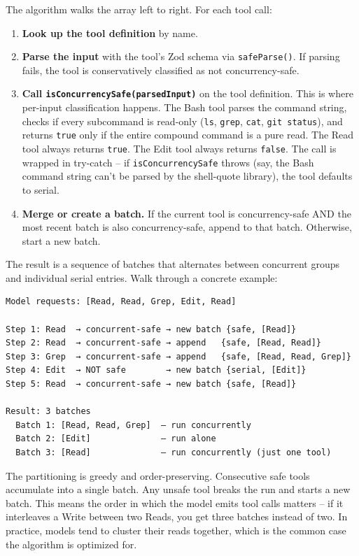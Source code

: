 \documentclass[
  english,
  11pt,
  letterpaper,
]{book}
\providecommand{\tightlist}{%
  \setlength{\itemsep}{0pt}\setlength{\parskip}{0pt}}
\begin{document}
The algorithm walks the array left to right. For each tool call:

\begin{enumerate}
\def\labelenumi{\arabic{enumi}.}
\tightlist
\item
  \textbf{Look up the tool definition} by name.
\item
  \textbf{Parse the input} with the tool's Zod schema via
  \texttt{safeParse()}. If parsing fails, the tool is conservatively
  classified as not concurrency-safe.
\item
  \textbf{Call \texttt{isConcurrencySafe(parsedInput)}} on the tool
  definition. This is where per-input classification happens. The Bash
  tool parses the command string, checks if every subcommand is
  read-only (\texttt{ls}, \texttt{grep}, \texttt{cat},
  \texttt{git\ status}), and returns \texttt{true} only if the entire
  compound command is a pure read. The Read tool always returns
  \texttt{true}. The Edit tool always returns \texttt{false}. The call
  is wrapped in try-catch -- if \texttt{isConcurrencySafe} throws (say,
  the Bash command string can't be parsed by the shell-quote library),
  the tool defaults to serial.
\item
  \textbf{Merge or create a batch.} If the current tool is
  concurrency-safe AND the most recent batch is also concurrency-safe,
  append to that batch. Otherwise, start a new batch.
\end{enumerate}

The result is a sequence of batches that alternates between concurrent
groups and individual serial entries. Walk through a concrete example:

\begin{verbatim}
Model requests: [Read, Read, Grep, Edit, Read]

Step 1: Read  → concurrent-safe → new batch {safe, [Read]}
Step 2: Read  → concurrent-safe → append   {safe, [Read, Read]}
Step 3: Grep  → concurrent-safe → append   {safe, [Read, Read, Grep]}
Step 4: Edit  → NOT safe        → new batch {serial, [Edit]}
Step 5: Read  → concurrent-safe → new batch {safe, [Read]}

Result: 3 batches
  Batch 1: [Read, Read, Grep]  — run concurrently
  Batch 2: [Edit]              — run alone
  Batch 3: [Read]              — run concurrently (just one tool)
\end{verbatim}

The partitioning is greedy and order-preserving. Consecutive safe tools
accumulate into a single batch. Any unsafe tool breaks the run and
starts a new batch. This means the order in which the model emits tool
calls matters -- if it interleaves a Write between two Reads, you get
three batches instead of two. In practice, models tend to cluster their
reads together, which is the common case the algorithm is optimized for.
\end{document}

